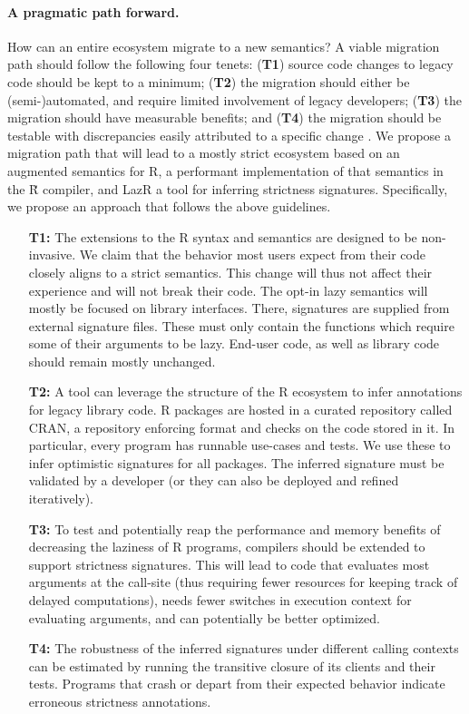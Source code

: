 \documentclass[review,nonacm,screen,acmsmall,anonymous=true]{acmart}
\newcommand{\authorcomment}[3]{}
\newcommand{\SK}[1]{\authorcomment{yellow}{SK}{#1}}
\newcommand{\lazr}{{\sf LazR}\xspace}
\renewcommand{\Rsh}{{\sf\u R}\xspace}
\begin{document}
\paragraph{A pragmatic path forward.} How can an entire ecosystem migrate to
a new semantics? A viable migration path should follow the following \SK{follow the following?} four
tenets: ({\bf T1}) source code changes to legacy code should be kept to a
minimum; ({\bf T2}) the migration should either \SK{'both'? or is it 'either' and we are missing an 'or'} be (semi-)automated, and require
limited involvement of legacy developers; ({\bf T3}) the migration should have
measurable benefits; and ({\bf T4}) the migration should be testable with
discrepancies easily attributed to a specific change \SK{I find this sentence hard to grasp}.
%
%
We propose a migration path that will lead to a mostly strict ecosystem based on
an augmented semantics for R, a performant implementation of that semantics in
the \Rsh compiler, and \lazr a tool for inferring strictness signatures.
Specifically, we propose an approach that follows the above guidelines.
\begin{itemize}
\item[{\bf T1:}] The extensions to the R syntax and semantics are designed to
  be non-invasive. We claim that the behavior most users expect from their
  code closely aligns to a strict semantics. This change will thus not affect
  their experience and will not break their code. The opt-in lazy semantics will
  mostly be focused on \SK{intended for?} library interfaces. There, signatures are supplied from
  external signature files. These must only contain the functions which require
  some of their arguments to be lazy. End-user code, as well as library code should
  remain mostly unchanged.
\item[{\bf T2:}] A tool can leverage the structure of the R ecosystem to infer
  annotations for legacy library code. R packages are hosted in a curated
  repository called CRAN, a repository enforcing format and checks on the code
  stored in it. In particular, every program has runnable use-cases and tests.
  We use these to infer optimistic signatures for all packages. The inferred
  signature must be validated by a developer (or they can also be deployed and
  refined iteratively).
\item[{\bf T3:}] To test and potentially reap the performance and memory benefits of decreasing
  the laziness of R programs, compilers should be extended to
  support strictness signatures. This will lead to code that evaluates most
  arguments at the call-site (thus requiring fewer resources for keeping track
  of delayed computations), needs fewer switches in execution context for
  evaluating arguments, and can potentially be better optimized.
\item[{\bf T4:}] The robustness of the inferred signatures under different
  calling contexts can be estimated by running the transitive closure
  of its clients and their tests. Programs that crash or depart from their
  expected behavior indicate erroneous strictness annotations.
\end{itemize}
\end{document}
